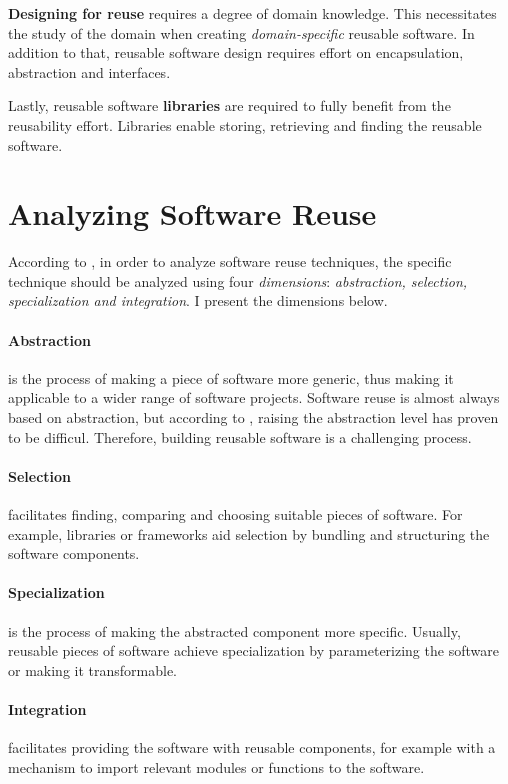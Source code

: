 \textbf{Designing for reuse} requires a degree of domain knowledge. This necessitates the study of the domain when creating \emph{domain-specific} reusable software. In addition to that, reusable software design requires effort on encapsulation, abstraction and interfaces.

Lastly, reusable software \textbf{libraries} are required to fully benefit from the reusability effort. Libraries enable storing, retrieving and finding the reusable software.

\section{Analyzing Software Reuse}
According to \citet{krueger_software_1992}, in order to analyze software reuse techniques, the specific technique should be analyzed using four \emph{dimensions}: \emph{abstraction, selection, specialization and integration}. I present the dimensions below.

\paragraph{Abstraction} is the process of making a piece of software more generic, thus making it applicable to a wider range of software projects. Software reuse is almost always based on abstraction, but according to \citet{krueger_software_1992}, raising the abstraction level has proven to be difficul. Therefore, building reusable software is a challenging process.

\paragraph{Selection} facilitates finding, comparing and choosing suitable pieces of software. For example, libraries or frameworks aid selection by bundling and structuring the software components.

\paragraph{Specialization} is the process of making the abstracted component more specific. Usually, reusable pieces of software achieve specialization by parameterizing the software or making it transformable.

\paragraph{Integration} facilitates providing the software with reusable components, for example with a mechanism to import relevant modules or functions to the software.

